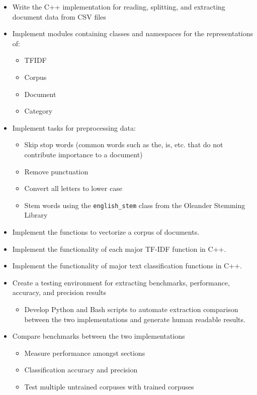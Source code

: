 \documentclass[conference]{IEEEtran}
\newcommand{\code}[1]{\lstinline[basicstyle=\ttfamily]|#1|}
\begin{document}
\begin{itemize}
    \item Write the C++ implementation for reading, splitting, and extracting document data from CSV files
    \item Implement modules containing classes and namespaces for the representations of:
    {
        \begin{itemize}    
            \item TFIDF
            \item Corpus
            \item Document
            \item Category
        \end{itemize}
    }
    \item Implement tasks for preprocessing data:
    {
        \begin{itemize}    
            \item Skip stop words (common words such as the, is, etc. that do not contribute importance to a document)
            \item Remove punctuation
            \item Convert all letters to lower case
            \item Stem words using the \code{english_stem} class from the Oleander Stemming Library~\cite{b5}
        \end{itemize}
    }
    \item Implement the functions to vectorize a corpus of documents.
    \item Implement the functionality of each major TF-IDF function in C++.
    \item Implement the functionality of major text classification functions in C++.
    \item Create a testing environment for extracting benchmarks, performance, accuracy, and precision results
    {
        \begin{itemize}    
            \item Develop Python and Bash scripts to automate extraction comparison between the two implementations and generate human readable results.
        \end{itemize}
    }
    \item Compare benchmarks between the two implementations
    {
        \begin{itemize}    
            \item Measure performance amongst sections
            \item Classification accuracy and precision
            \item Test multiple untrained corpuses with trained corpuses
        \end{itemize}
    }
\end{itemize}
\end{document}
